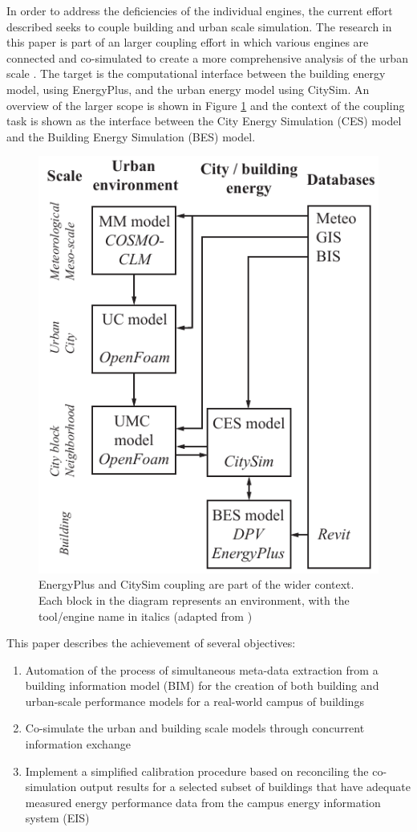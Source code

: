 \documentclass{tBPS2e}
\theoremstyle{plain}
\theoremstyle{definition}
\theoremstyle{remark}
\begin{document}
In order to address the deficiencies of the individual engines, the current effort described seeks to couple building and urban scale simulation. The research in this paper is part of an larger coupling effort in which various engines are connected and co-simulated to create a more comprehensive analysis of the urban scale \citep{Dorer:2013vt}. The target is the computational interface between the building energy model, using EnergyPlus, and the urban energy model using CitySim. An overview of the larger scope is shown in Figure \ref{fig:UMEM} and the context of the coupling task is shown as the interface between the City Energy Simulation (CES) model and the Building Energy Simulation (BES) model. 

\begin{figure}
\centering
\includegraphics[scale=1.0]{figures/UMEM_overview_new}
\caption{EnergyPlus and CitySim coupling are part of the wider context. Each block in the diagram represents an environment, with the tool/engine name in italics (adapted from \citep{Dorer:2013vt})}
\label{fig:UMEM}
\end{figure}

This paper describes the achievement of several objectives:
\begin{enumerate}
  \item Automation of the process of simultaneous meta-data extraction from a building information model (BIM) for the creation of both building and urban-scale performance models for a real-world campus of buildings
  \item Co-simulate the urban and building scale models through concurrent information exchange
  \item Implement a simplified calibration procedure based on reconciling the co-simulation output results for a selected subset of buildings that have adequate measured energy performance data from the campus energy information system (EIS) 
\end{enumerate}
\end{document}
